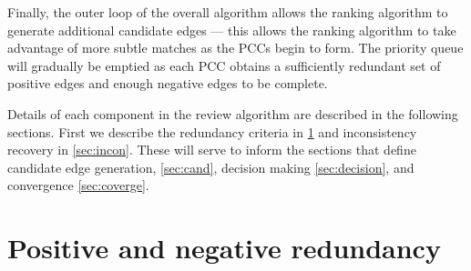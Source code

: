 Finally, the outer loop of the overall algorithm allows the ranking algorithm to generate additional candidate
edges --- this allows the ranking algorithm to take advantage of more subtle matches as the PCCs begin to form. The
priority queue will gradually be emptied as each PCC obtains a sufficiently redundant set of positive edges and
enough negative edges to be complete.

Details of each component in the review algorithm are described in the following sections.  First we describe the
redundancy criteria in \cref{sec:redun} and inconsistency recovery in \cref{sec:incon}. These will serve to inform
the sections that define candidate edge generation, \cref{sec:cand}, decision making \cref{sec:decision},  and
convergence \cref{sec:coverge}.


\section{Positive and negative redundancy}\label{sec:redun}

